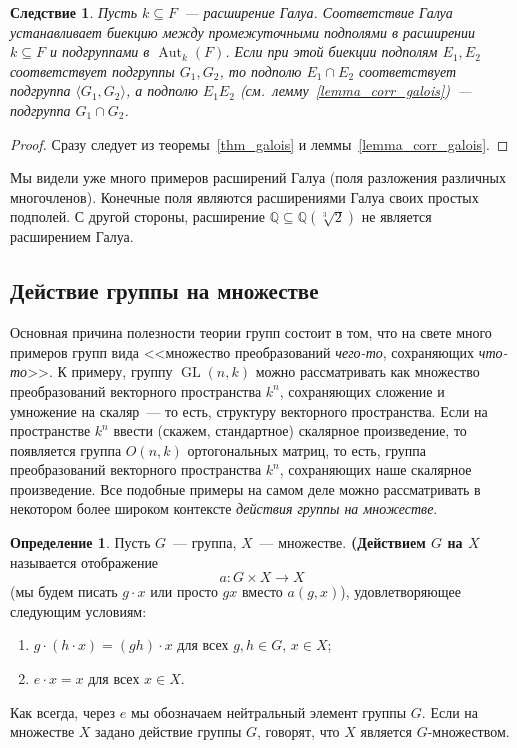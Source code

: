 \documentclass[a4paper,11pt]{scrartcl}
\theoremstyle{plain}
\newtheorem{corollary}[theorem]{Следствие}
\theoremstyle{definition}
\newtheorem{definition}[theorem]{Определение}
\newcommand\dfn[1]{\textbf{#1}}
\newcommand\mb{\mathbb}
\newcommand\sseq{\subseteq}
\newcommand\la{\langle}
\newcommand\ra{\rangle}
\newcommand\GL{\operatorname{GL}}
\newcommand\Aut{\operatorname{Aut}}
\begin{document}
\begin{corollary}
Пусть $k\subseteq F$~--- расширение Галуа.
Соответствие Галуа устанавливает биекцию между промежуточными
подполями в расширении $k\sseq F$ и подгруппами
в $\Aut_k(F)$.
Если при этой биекции подполям $E_1,E_2$ соответствует подгруппы
$G_1,G_2$, то подполю $E_1\cap E_2$ соответствует подгруппа
$\la G_1,G_2\ra$, а подполю $E_1E_2$
(см.~лемму~\ref{lemma_corr_galois})~--- подгруппа $G_1\cap G_2$.
\end{corollary}
\begin{proof}
Сразу следует из теоремы~\ref{thm_galois}
и леммы~\ref{lemma_corr_galois}.
\end{proof}

Мы видели уже много примеров расширений Галуа (поля разложения
различных многочленов).
Конечные поля являются расширениями Галуа своих простых подполей.
С другой стороны, расширение
$\mb Q\sseq \mb Q(\sqrt[3]{2})$ не является расширением Галуа. 

\subsection{Действие группы на множестве}

Основная причина полезности теории групп состоит в том,
что на свете много примеров групп вида <<множество преобразований
{\em чего-то}, сохраняющих {\em что-то}>>.
К примеру, группу $\GL(n,k)$ можно рассматривать как множество
преобразований векторного пространства $k^n$, сохраняющих сложение
и умножение на скаляр~--- то есть, структуру векторного пространства.
Если на пространстве $k^n$ ввести (скажем, стандартное)
скалярное произведение, то появляется группа $O(n,k)$ ортогональных
матриц, то есть, группа преобразований векторного пространства $k^n$,
сохраняющих наше скалярное произведение.
Все подобные примеры на самом деле можно рассматривать в некотором
более широком контексте {\em действия группы на множестве}.

\begin{definition}\label{dfn:group-action}
Пусть $G$~--- группа, $X$~--- множестве.
\dfn{(Действием $G$ на $X$} называется отображение
$$
a\colon G\times X\to X
$$
(мы будем писать $g\cdot x$ или просто $gx$ вместо $a(g,x)$),
удовлетворяющее следующим условиям:
\begin{enumerate}
\item $g\cdot (h\cdot x) = (gh)\cdot x$ для всех $g,h\in G$, $x\in X$;
\item $e\cdot x = x$ для всех $x\in X$.
\end{enumerate}
Как всегда, через $e$ мы обозначаем нейтральный элемент группы $G$.
Если на множестве $X$ задано действие группы $G$,
говорят, что $X$ является $G$-множеством.
\end{definition}
\end{document}
